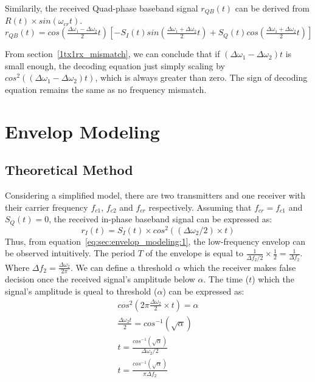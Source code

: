 Similarily, the received Quad-phase baseband signal $r_{QB}(t)$ can be derived from $R(t)\times sin(\omega_{cr}t)$.
\begin{equation}
r_{QB}(t) = cos(\tfrac{\Delta\omega_1-\Delta\omega_2}{2}t)\left[
-S_I(t)sin(\tfrac{\Delta\omega_1+\Delta\omega_2}{2}t) + S_Q(t)cos(\tfrac{\Delta\omega_1+\Delta\omega_2}{2}t)\right]
\end{equation}

From section~\ref{1tx1rx_mismatch}, we can conclude that if $(\Delta\omega_1-\Delta\omega_2)t$ is small enough, the 
decoding equation just simply scaling by $cos^2((\Delta\omega_1-\Delta\omega_2)t)$, which is always greater than zero. 
The sign of decoding equation remains the same as no frequency mismatch.

\section{Envelop Modeling}
\subsection{Theoretical Method}
\label{sec:envelop_modeling}
Considering a simplified model, there are two transmitters and one receiver with their carrier frequency 
$f_{c1}$, $f_{c2}$ and $f_{cr}$ respectively. Assuming that $f_{cr} = f_{c1}$ and $S_Q(t) = 0$, the received
in-phase baseband signal can be expressed as:
\begin{equation}
r_I(t) = S_I(t)\times cos^2((\Delta\omega_2/2)\times t)
\label{eq:sec:envelop_modeling:1}
\end{equation}
Thus, from equation~\ref{eq:sec:envelop_modeling:1}, the low-frequency envelop can be observed intuitively.
The period $T$ of the envelope is equal to $\tfrac{1}{\Delta f_2/2}\times \tfrac{1}{2} = \tfrac{1}{\Delta f_2}$.
Where $\Delta f_2 = \tfrac{\Delta\omega_2}{2\pi}$. 
We can define a threshold $\alpha$ which the receiver makes false decision once the received signal's amplitude 
below $\alpha$. The time ($t$) which the signal's amplitude is queal to threshold ($\alpha$) can be expressed as:
\begin{eqnarray}
cos^2(2\pi\tfrac{\Delta\omega_2}{2}\times t) = \alpha \\
\tfrac{\Delta\omega_2 t}{2} = cos^{-1}(\sqrt{\alpha}) \\
t = \tfrac{cos^{-1}(\sqrt{\alpha})}{\Delta\omega_2/2} \\
t = \tfrac{cos^{-1}(\sqrt{\alpha})}{\pi\Delta f_2} \\
\end{eqnarray}

